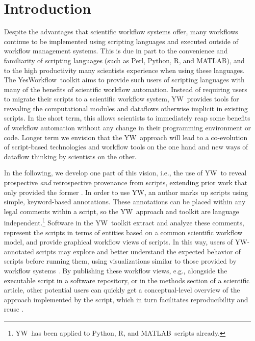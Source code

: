 \documentclass[letterpaper,twocolumn,10pt]{article}
\newcommand{\YW}{\textsf{YesWorkflow}}
\newcommand{\yw}{\textsf{YW}}
\newcommand{\R}{\textsf{R}}
\newcommand{\MATLAB}{\textsf{MATLAB}}
\begin{document}
%
\section{Introduction} \label{intro}

Despite the advantages that scientific workflow systems offer, many
workflows continue to be implemented using scripting languages and
executed outside of workflow management systems. This is due in part
to the convenience and familiarity of scripting languages (such as
Perl, Python, \R, and \MATLAB), and to the high productivity many
scientists experience when using these languages. The \YW\ toolkit
\cite{yw-website,mcphillips2015ywIJDC} aims to provide
such users of scripting languages with many of the benefits of
scientific workflow automation. Instead of requiring users to migrate
their scripts to a scientific workflow system, \yw\ provides tools for
revealing the computational modules and dataflows otherwise implicit
in existing scripts. In the short term, this allows scientists to
immediately reap some benefits of workflow automation without any
change in their programming environment or code. Longer term we
envision that the \yw\ approach will lead to a co-evolution of
script-based technologies and workflow tools on the one hand and new
ways of dataflow thinking by %
scientists on the other.

In the following, we develop one part of this vision, i.e., the use of
\yw\ to reveal prospective \emph{and} retrospective provenance
\cite{zhao2006applying} from scripts, extending prior work that only
provided the former \cite{mcphillips2015ywIJDC}.
In order to use \yw, an author marks up scripts using simple,
keyword-based annotations. These annotations can be placed within any
legal comments within a script, so the \yw\ approach and toolkit are 
language independent.\footnote{\yw\ has been applied to
  Python, \R, and \MATLAB\ scripts already.}  %
%
Software in the \yw\ toolkit extract and analyze these comments,
represent the scripts in terms of entities based on a common
scientific workflow model, and provide graphical workflow views of
scripts. In this way, users of \yw-annotated scripts may explore and
better understand the expected behavior of scripts before running
them, using visualizations similar to those provided by workflow
systems 
\cite{ludascher2006scientific,wolstencroft2013taverna,freire2014reproducibility}.
By publishing these workflow views, e.g., alongside the executable
script in a software repository, or in the methods section of a
scientific article, other potential users can quickly get a
conceptual-level overview of the approach implemented by the script,
which in turn facilitates reproducibility and reuse
\cite{gandrud2013reproducible,stodden2014implementing}.
\end{document}
